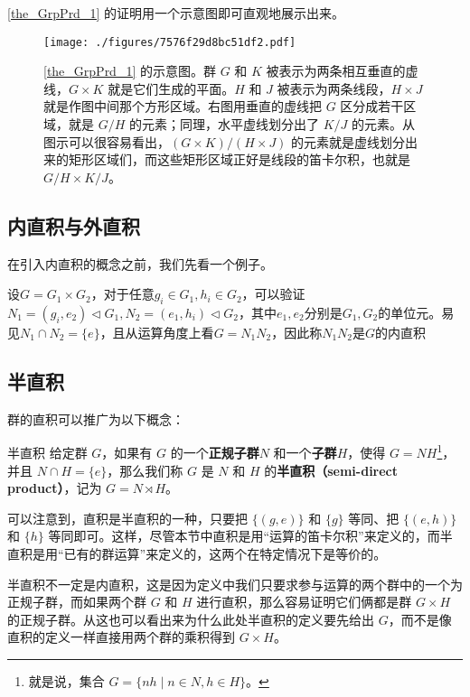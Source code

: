 \autoref{the_GrpPrd_1} 的证明用一个示意图即可直观地展示出来。

\begin{figure}[ht]
\centering
\texttt{[image: ./figures/7576f29d8bc51df2.pdf]}
\caption{\autoref{the_GrpPrd_1} 的示意图。群 $G$ 和 $K$ 被表示为两条相互垂直的虚线，$G\times K$ 就是它们生成的平面。$H$ 和 $J$ 被表示为两条线段，$H\times J$ 就是作图中间那个方形区域。右图用垂直的虚线把 $G$ 区分成若干区域，就是 $G/H$ 的元素；同理，水平虚线划分出了 $K/J$ 的元素。从图示可以很容易看出，$(G\times K)/(H\times J)$ 的元素就是虚线划分出来的矩形区域们，而这些矩形区域正好是线段的笛卡尔积，也就是 $G/H\times K/J$。} \label{fig_GrpPrd_1}
\end{figure}
\subsection{内直积与外直积}
在引入内直积的概念之前，我们先看一个例子。

设$G=G_1\times G_2$，对于任意$g_i\in G_1,h_i\in G_2$，可以验证$N_1=(g_i,e_2)\vartriangleleft G_1,N_2=(e_1,h_i)\vartriangleleft G_2$，其中$e_1,e_2$分别是$G_1,G_2$的单位元。易见$N_1\cap N_2=\{e\}$，且从运算角度上看$G=N_1N_2$，因此称$N_1N_2$是$G$的内直积

\subsection{半直积}

群的直积可以推广为以下概念：

\begin{definition}{半直积}
给定群 $G$，如果有 $G$ 的一个\textbf{正规子群}$N$ 和一个\textbf{子群}$H$，使得 $G = N H$\footnote{就是说，集合 $G= \{n h \mid n \in N, h\in H\}$。}，并且 $N \cap H = \{e\}$，那么我们称 $G$ 是 $N$ 和 $H$ 的\textbf{半直积（semi-direct product）}，记为 $G = N \rtimes H$。
\end{definition}

可以注意到，直积是半直积的一种，只要把 $\{(g, e)\}$ 和 $\{g\}$ 等同、把 $\{(e, h)\}$ 和 $\{h\}$ 等同即可。这样，尽管本节中直积是用“运算的笛卡尔积”来定义的，而半直积是用“已有的群运算”来定义的，这两个在特定情况下是等价的。

半直积不一定是内直积，这是因为定义中我们只要求参与运算的两个群中的一个为正规子群，而如果两个群 $G$ 和 $H$ 进行直积，那么容易证明它们俩都是群 $G\times H$ 的正规子群。从这也可以看出来为什么此处半直积的定义要先给出 $G$，而不是像直积的定义一样直接用两个群的乘积得到 $G\times H$。

